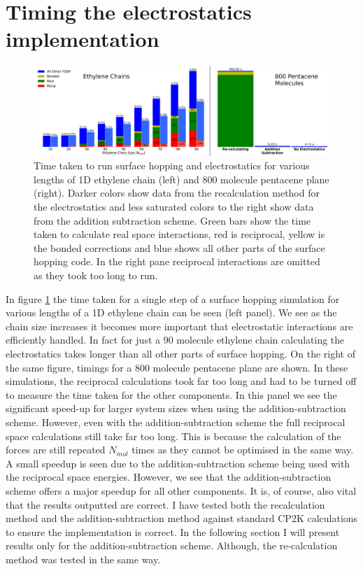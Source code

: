 \section{Timing the electrostatics implementation}
\begin{figure}[ht]
  \includegraphics[width=\textwidth]{./img/ES/TimingsReCalc_vs_AddSub.png}
  \caption{\label{fig:AddSubTimings}Time taken to run surface hopping and electrostatics for various lengths of 1D ethylene chain (left) and 800 molecule pentacene plane (right). Darker colors show data from the recalculation method for the electrostatics and less saturated colors to the right show data from the addition subtraction scheme. Green bars show the time taken to calculate real space interactions, red is reciprocal, yellow is the bonded corrections and blue shows all other parts of the surface hopping code. In the right pane reciprocal interactions are omitted as they took too long to run.}
\end{figure}
\noindent In figure \ref{fig:AddSubTimings} the time taken for a single step of a surface hopping simulation for various lengths of a 1D ethylene chain can be seen (left panel). We see as the chain size increases it becomes more important that electrostatic interactions are efficiently handled. In fact for just a 90 molecule ethylene chain calculating the electrostatics takes longer than all other parts of surface hopping. On the right of the same figure, timings for a 800 molecule pentacene plane are shown. In these simulations, the reciprocal calculations took far too long and had to be turned off to measure the time taken for the other components. In this panel we see the significant speed-up for larger system sizes when using the addition-subtraction scheme. However, even with the addition-subtraction scheme the full reciprocal space calculations still take far too long. This is because the calculation of the forces are still repeated $N_{mol}$ times as they cannot be optimised in the same way. A small speedup is seen due to the addition-subtraction scheme being used with the reciprocal space energies. However, we see that the addition-subtraction scheme offers a major speedup for all other components. It is, of course, also vital that the results outputted are correct. I have tested both the recalculation method and the addition-subtraction method against standard CP2K calculations to ensure the implementation is correct. In the following section I will present results only for the addition-subtraction scheme. Although, the re-calculation method was tested in the same way.

